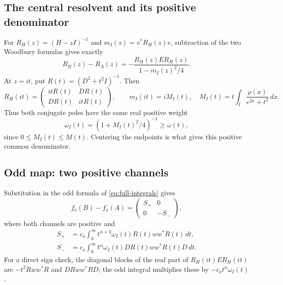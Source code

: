 \documentclass[11pt]{article}
\numberwithin{equation}{section}
\begin{document}
\subsection*{The central resolvent and its positive denominator}
For $R_H(z)=(H-zI)^{-1}$ and $m_I(z)=v^*R_H(z)v$, subtraction of
the two Woodbury formulas gives exactly
\begin{equation}\label{eq:central-woodbury}
 R_B(z)-R_A(z)
       =-\frac{R_H(z)E R_H(z)}{1-m_I(z)^2/4}.
\end{equation}
At $z=it$, put $R(t)=(D^2+t^2I)^{-1}$. Then
\begin{equation}\label{eq:central-resolvent}
 R_H(it)=\begin{pmatrix}itR(t)&DR(t)\\DR(t)&itR(t)\end{pmatrix},
 \qquad m_I(it)=iM_I(t),\quad
 M_I(t)=t\int_I\frac{\rho(x)}{e^{2x}+t^2}\,dx.
\end{equation}
Thus both conjugate poles have the same real positive weight
\[
 \omega_I(t)=(1+M_I(t)^2/4)^{-1}\ge\omega(t),
\]
since $0\le M_I(t)\le M(t)$. Centering the endpoints is what gives
this positive common denominator.

\subsection*{Odd map: two positive channels}
Substitution in the odd formula of \eqref{eq:full-integrals} gives
\begin{equation}\label{eq:odd-channels}
 f_o(B)-f_o(A)=\begin{pmatrix}S_+&0\\0&-S_-\end{pmatrix},
\end{equation}
where both channels are positive and
\begin{align}
 S_+&=c_o\int_0^\infty t^{\alpha+2}\omega_I(t)
                    R(t)ww^*R(t)\,dt,\nonumber\\
 S_-&=c_o\int_0^\infty t^\alpha\omega_I(t)
                    DR(t)ww^*R(t)D\,dt.                 \label{eq:odd-positive-integrals}
\end{align}
For a direct sign check, the diagonal blocks of the real part of
$R_H(it)E R_H(it)$ are $-t^2Rww^*R$ and $DRww^*RD$;
the odd integral multiplies these by $-c_ot^\alpha\omega_I(t)$.
\end{document}
